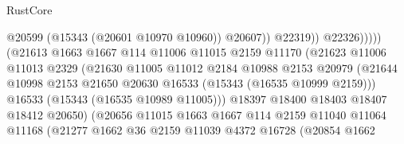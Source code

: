 \begin{lexlean}{RustCore}
\begin{coremodule}
                                                  @20599
                                                  (@15343 (@20601 @10970 @10960))
                                                  @20607))
                                              @22319))
                                          @22326)))))
                                (@21613
                                  @1663
                                  @1667
                                  @114
                                  @11006
                                  @11015
                                  @2159
                                  @11170
                                  (@21623
                                    @11006
                                    @11013
                                    @2329
                                    (@21630
                                      @11005
                                      @11012
                                      @2184
                                      @10988
                                      @2153
                                      @20979
                                      (@21644
                                        @10998
                                        @2153
                                        @21650
                                        @20630
                                        @16533
                                        (@15343 (@16535 @10999 @2159)))
                                      @16533
                                      (@15343 (@16535 @10989 @11005)))
                                    @18397
                                    @18400
                                    @18403
                                    @18407
                                    @18412
                                    @20650)
                                  (@20656
                                    @11015
                                    @1663
                                    @1667
                                    @114
                                    @2159
                                    @11040
                                    @11064
                                    @11168
                                    (@21277
                                      @1662
                                      @36
                                      @2159
                                      @11039
                                      @4372
                                      @16728
                                      (@20854
                                        @1662

\end{coremodule}
\end{lexlean}
